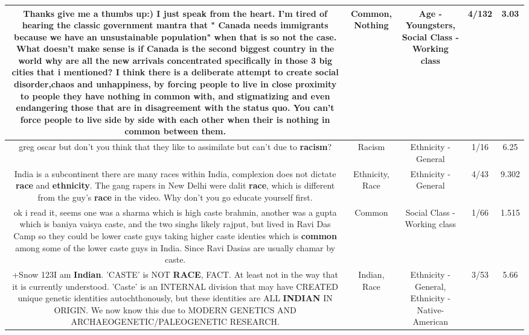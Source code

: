 \documentclass[11pt]{article}
\newlength\mylength
\begin{document}
\begin{center}
\begin{longtable}{|C{.65\mylength}|C{.30\mylength}|C{.12\mylength}|C{.12\mylength}|C{.12\mylength}|}
  \small Thanks give me a thumbs up:) I just speak from the heart. I'm tired of hearing the classic government mantra that  " Canada needs immigrants because we have an unsustainable population" when that is so not the case. What doesn't make sense is if Canada is the second biggest country in the world why are all the new arrivals concentrated specifically in those 3 big cities that i mentioned? I think there is a deliberate attempt to create social disorder,chaos and unhappiness, by forcing people to live in close proximity to people they have \textbf{nothing} in \textbf{common} with, and stigmatizing and even endangering those that are in disagreement with the status quo. You can't force people to live side by side with each other when their is \textbf{nothing} in \textbf{common} between them.\normalsize   & Common, Nothing & Age - Youngsters, Social Class - Working class & 4/132 & 3.03 \\  \hline
  \small greg oscar but don't you think that they like to assimilate but can't due to \textbf{racism}?\normalsize   & Racism & Ethnicity - General & 1/16 & 6.25 \\  \hline
  \small India is a subcontinent there are many races within India, complexion does not dictate \textbf{race} and \textbf{ethnicity}. The gang rapers in New Delhi were dalit \textbf{race}, which is different from the guy's \textbf{race} in the video. Why don't you go educate yourself first.\normalsize   & Ethnicity, Race & Ethnicity - General & 4/43 & 9.302 \\  \hline
  \small ok i read it, seems one was a sharma which is high caste brahmin, another was a gupta which is baniya vaisya caste, and the two singhs likely rajput, but lived in Ravi Das Camp so they could be lower caste guys taking higher caste identies which is \textbf{common} among some of the lower caste guys in India. Since Ravi Dasias are usually chamar by caste.\normalsize   & Common & Social Class - Working class & 1/66 & 1.515 \\  \hline
  \small +Snow 123I am \textbf{Indian}. 'CASTE' is NOT \textbf{RACE}, FACT. At least not in the way that it is currently understood. 'Caste' is an INTERNAL division that may have CREATED unique genetic identities autochthonously, but these identities are ALL \textbf{INDIAN} IN ORIGIN. We now know this due to MODERN GENETICS AND ARCHAEOGENETIC/PALEOGENETIC RESEARCH.\normalsize   & Indian, Race & Ethnicity - General, Ethnicity - Native-American & 3/53 & 5.66 \\  \hline

\end{longtable}
\end{center}
\end{document}
